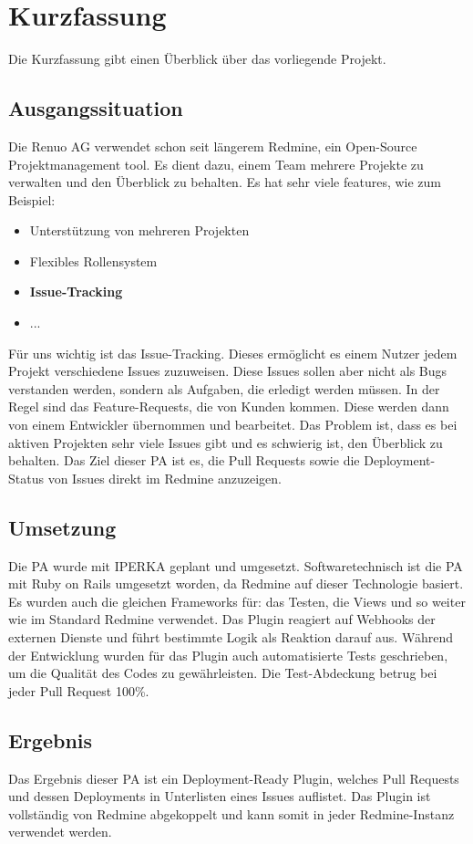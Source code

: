 \chapter{Kurzfassung}

Die Kurzfassung gibt einen Überblick über das vorliegende Projekt.

\section{Ausgangssituation}

Die Renuo AG verwendet schon seit längerem Redmine, ein Open-Source Projektmanagement tool. Es dient dazu, einem
Team mehrere Projekte zu verwalten und den Überblick zu behalten. Es hat sehr viele features, wie zum Beispiel: \cite{redmine_homepage}
\begin{itemize}
    \item Unterstützung von mehreren Projekten
    \item Flexibles Rollensystem
    \item \textbf{Issue-Tracking}
    \item ...
\end{itemize}
Für uns wichtig ist das Issue-Tracking. Dieses ermöglicht es einem Nutzer jedem Projekt verschiedene Issues zuzuweisen.
Diese Issues sollen aber nicht als Bugs verstanden werden, sondern als Aufgaben, die erledigt werden müssen. In der Regel sind das
Feature-Requests, die von Kunden kommen. Diese werden dann von einem Entwickler übernommen und bearbeitet. \newline
Das Problem ist, dass es bei aktiven Projekten sehr viele Issues gibt und es schwierig ist, den Überblick zu behalten.
Das Ziel dieser PA ist es, die Pull Requests sowie die Deployment-Status von Issues direkt im Redmine anzuzeigen.

\section{Umsetzung}

Die PA wurde mit IPERKA geplant und umgesetzt. \newline
Softwaretechnisch ist die PA mit Ruby on Rails umgesetzt worden, da Redmine auf dieser Technologie basiert. Es wurden auch
die gleichen Frameworks für: das Testen, die Views und so weiter wie im Standard Redmine verwendet. \newline
Das Plugin reagiert auf Webhooks der externen Dienste und führt bestimmte Logik als Reaktion darauf aus. \newline
Während der Entwicklung wurden für das Plugin auch automatisierte Tests geschrieben, um die Qualität des Codes zu gewährleisten.
Die Test-Abdeckung betrug bei jeder Pull Request 100\%.

\section{Ergebnis}

Das Ergebnis dieser PA ist ein Deployment-Ready Plugin, welches Pull Requests und dessen Deployments in Unterlisten eines
Issues auflistet. \newline
Das Plugin ist vollständig von Redmine abgekoppelt und kann somit in jeder Redmine-Instanz verwendet werden. \newline

